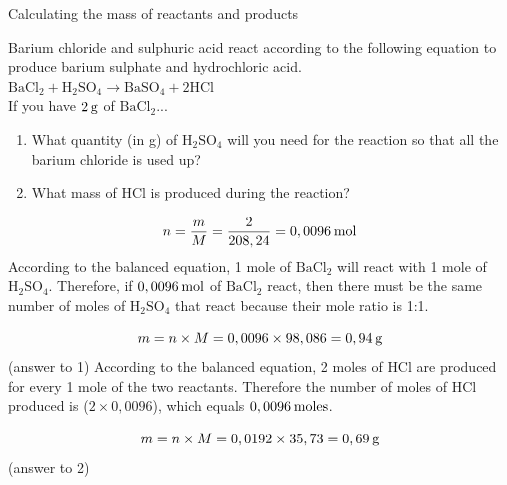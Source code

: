 \label{m38717*secfhsst!!!underscore!!!id695}\vspace{-2cm} 
      \begin{wex}{ Calculating the mass of reactants and products }
{
      \label{m38717*id279063}Barium chloride and sulphuric acid react according to the following equation to produce barium sulphate and hydrochloric acid.\\
      \label{m38717*id279070}
        ${\text{BaCl}}_{2}+{\text{H}}_{2}{\text{SO}}_{4}\to {\text{BaSO}}_{4}+2\text{HCl}$
      \\
      \label{m38717*id279141}If you have $2\phantom{\rule{2pt}{0ex}}\text{g}$ of $\text{BaCl}{}_{2}$... 
      \label{m38717*id279158}\begin{enumerate}[noitemsep, label=\textbf{\arabic*}. ] 
            \label{m38717*uid37}\item What quantity (in g) of $\text{H}{}_{2}\text{SO}{}_{4}$ will you need for the reaction so that all the barium chloride is used up?
\label{m38717*uid38}\item What mass of $\text{HCl}$ is produced during the reaction?
\end{enumerate}
      \vspace{5pt}
}
{
        
    \begin{equation*}
    n=\frac{m}{M}=\frac{2}{208,24}=0,0096\phantom{\rule{2pt}{0ex}}\text{mol}
      \end{equation*}
      \label{m38717*id279344}According to the balanced equation, 1 mole of $\text{BaCl}{}_{2}$ will react with 1 mole of $\text{H}{}_{2}\text{SO}{}_{4}$. Therefore, if $0,0096\phantom{\rule{2pt}{0ex}}\text{mol}$ of $\text{BaCl}{}_{2}$ react, then there must be the same number of moles of $\text{H}{}_{2}\text{SO}{}_{4}$ that react because their mole ratio is 1:1.
      \label{m38717*id279456}\nopagebreak\noindent{}
        
    \begin{equation*}
    m=n\ensuremath{\times}M=0,0096\ensuremath{\times}98,086=0,94\phantom{\rule{2pt}{0ex}}\text{g}
      \end{equation*}
      \label{m38717*id279505}(answer to 1) 
      \label{m38717*id279513}According to the balanced equation, 2 moles of $\text{HCl}$ are produced for every 1 mole of the two reactants. Therefore the number of moles of $\text{HCl}$ produced is ($2\ensuremath{\times}0,0096$), which equals $0,0096\phantom{\rule{2pt}{0ex}}\text{moles}$.
      \label{m38717*id279531}\nopagebreak\noindent{}
        
    \begin{equation*}
    m=n\ensuremath{\times}M=0,0192\ensuremath{\times}35,73=0,69\phantom{\rule{2pt}{0ex}}\text{g}
      \end{equation*}
      \label{m38717*id279580}(answer to 2) 
}
    \end{wex}
